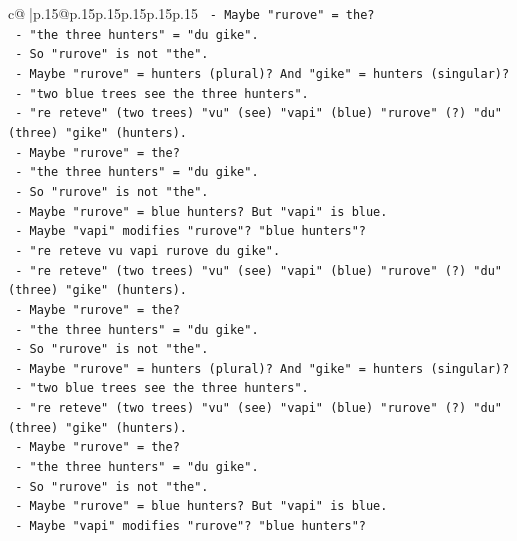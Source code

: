 \documentclass{article}
\begin{document}
{\begin{supertabular}{c@{$\;$}|p{.15\linewidth}@{}p{.15\linewidth}p{.15\linewidth}p{.15\linewidth}p{.15\linewidth}p{.15\linewidth}}
{{{\texttt{           {-} Maybe "rurove" = the?} \\
\texttt{           {-} "the three hunters" = "du gike".} \\
\texttt{           {-} So "rurove" is not "the".} \\
\texttt{           {-} Maybe "rurove" = hunters (plural)? And "gike" = hunters (singular)?} \\
\texttt{           {-} "two blue trees see the three hunters".} \\
\texttt{           {-} "re reteve" (two trees) "vu" (see) "vapi" (blue) "rurove" (?) "du" (three) "gike" (hunters).} \\
\texttt{           {-} Maybe "rurove" = the?} \\
\texttt{           {-} "the three hunters" = "du gike".} \\
\texttt{           {-} So "rurove" is not "the".} \\
\texttt{           {-} Maybe "rurove" = blue hunters? But "vapi" is blue.} \\
\texttt{           {-} Maybe "vapi" modifies "rurove"? "blue hunters"?} \\
\texttt{           {-} "re reteve vu vapi rurove du gike".} \\
\texttt{           {-} "re reteve" (two trees) "vu" (see) "vapi" (blue) "rurove" (?) "du" (three) "gike" (hunters).} \\
\texttt{           {-} Maybe "rurove" = the?} \\
\texttt{           {-} "the three hunters" = "du gike".} \\
\texttt{           {-} So "rurove" is not "the".} \\
\texttt{           {-} Maybe "rurove" = hunters (plural)? And "gike" = hunters (singular)?} \\
\texttt{           {-} "two blue trees see the three hunters".} \\
\texttt{           {-} "re reteve" (two trees) "vu" (see) "vapi" (blue) "rurove" (?) "du" (three) "gike" (hunters).} \\
\texttt{           {-} Maybe "rurove" = the?} \\
\texttt{           {-} "the three hunters" = "du gike".} \\
\texttt{           {-} So "rurove" is not "the".} \\
\texttt{           {-} Maybe "rurove" = blue hunters? But "vapi" is blue.} \\
\texttt{           {-} Maybe "vapi" modifies "rurove"? "blue hunters"?} \\
}}}
\end{supertabular}}
\end{document}

